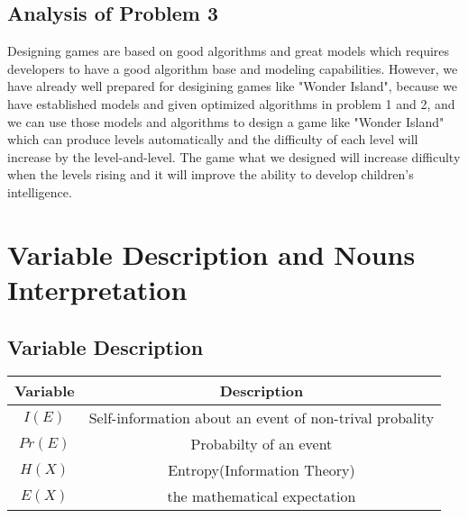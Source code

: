 \documentclass[12pt,a4paper,]{article}
\begin{document}
\subsection{Analysis of Problem 3}
Designing games are based on good algorithms and great models which requires developers to have a good algorithm base and modeling capabilities. However, we have already well prepared for desigining games like "Wonder Island", because we have established models and given optimized algorithms in problem 1 and 2, and we can use those models and algorithms to design a game like "Wonder Island" which can produce levels automatically and the difficulty of each level will increase by the level-and-level. The game what we designed will  increase difficulty when the levels rising and it will  improve the ability to develop children's intelligence. 

\section{Variable Description and Nouns Interpretation}

\subsection{Variable Description}
\begin{tabular}{|c|c|}%
\hline  %
Variable&Description\\
\hline  %
$I(E)$ & Self-information about an event of non-trival probality\\
\hline %
$Pr(E)$ & Probabilty of an event\\
\hline
$H(X)$ & Entropy(Information Theory)\\
\hline
$E(X)$ & the mathematical expectation\\
\hline
\end{tabular}
\end{document}
